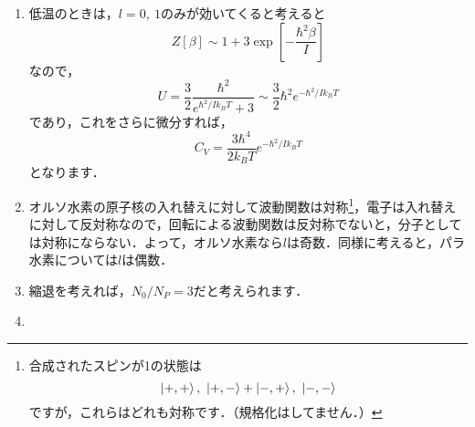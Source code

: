 \documentclass[a4paper,pdflatex,ja=standard]{bxjsarticle}
\begin{document}
\begin{enumerate}
  
  \item 

  低温のときは，$l=0,\ 1$のみが効いてくると考えると
  \begin{equation}
    Z[\beta]
    \sim
    1
    +
    3\exp\left[ -\frac{\hbar^2\beta}{I} \right]
  \end{equation}
  なので，
  \begin{equation}
    U
    =
    \frac{3}{2}
    \frac{\hbar^2}{e^{\hbar^2/Ik_BT}+3}
    \sim
    \frac{3}{2}\hbar^2e^{-\hbar^2/Ik_BT}
  \end{equation}
  であり，これをさらに微分すれば，
  \begin{equation}
    C_V
    =
    \frac{3\hbar^4}{2k_BT}e^{-\hbar^2/Ik_BT}
  \end{equation}
  となります．


  \item 

  オルソ水素の原子核の入れ替えに対して波動関数は対称\footnote{
    合成されたスピンが1の状態は
    $$
      \ket{+,+}
      ,\ 
      \ket{+,-}+\ket{-,+}
      ,\ 
      \ket{-,-}
    $$
    ですが，これらはどれも対称です．（規格化はしてません．）
  }，電子は入れ替えに対して反対称なので，回転による波動関数は反対称でないと，分子としては対称にならない．よって，オルソ水素なら$l$は奇数．同様に考えると，パラ水素については$l$は偶数．


  \item 

  縮退を考えれば，$N_0/N_P=3$だと考えられます．


  \item 


\end{enumerate}
\end{document}
